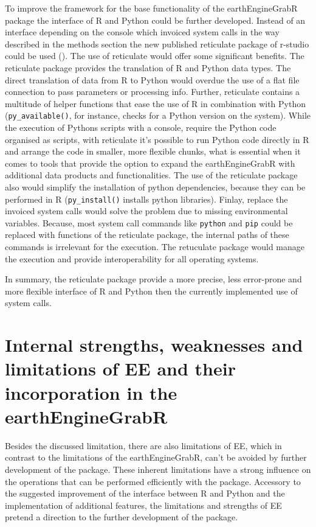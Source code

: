 To improve the framework for the base functionality of the earthEngineGrabR package the interface of R and Python could be further developed. Instead of an interface depending on the console which invoiced system calls in the way described in the methods section the new published reticulate package of r-studio could be used (\cite{reticulate}). The use of reticulate would offer some significant benefits. The reticulate package provides the translation of R and Python data types. The direct translation of data from R to Python would overdue the use of a flat file connection to pass parameters or processing info. Further, reticulate contains a multitude of helper functions that ease the use of R in combination with Python (\texttt{py\_available()}, for instance, checks for a Python version on the system). While the execution of Pythons scripts with a console, require the Python code organised as scripts, with reticulate it's possible to run Python code directly in R and arrange the code in smaller, more flexible chunks, what is essential when it comes to tools that provide the option to expand the earthEngineGrabR with additional data products and functionalities. The use of the reticulate package also would simplify the installation of python dependencies, because they can be performed in R (\texttt{py\_install()} installs python libraries). Finlay, replace the invoiced system calls would solve the problem due to missing environmental variables. Because, most system call commands like \texttt{python} and \texttt{pip} could be replaced with functions of the reticulate package, the internal paths of these commands is irrelevant for the execution. The retuculate package would manage the execution and provide interoperability for all operating systems.

In summary, the reticulate package provide a more precise, less error-prone and more flexible interface of R and Python then the currently implemented use of system calls.

\section{Internal strengths, weaknesses and limitations of EE and their incorporation in the earthEngineGrabR}

Besides the discussed limitation, there are also limitations of EE, which in contrast to the limitations of the earthEngineGrabR, can't be avoided by further development of the package. 
These inherent limitations have a strong influence on the operations that can be performed efficiently with the package.
Accessory to the suggested improvement of the interface between R and Python and the
implementation of additional features, the limitations and strengths of EE pretend a direction to the further development of the package.

